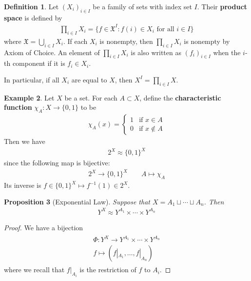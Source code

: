 \documentclass[12pt,b5paper,notitlepage]{article}
\theoremstyle{definition}
\newtheorem{df}{Definition}[section]
\newtheorem{eg}[df]{Example}
\theoremstyle{plain}
\newtheorem{pp}[df]{Proposition}
\newcommand{\fk}{\mathfrak}
\numberwithin{equation}{section}
\begin{document}
\begin{df}
Let $(X_i)_{i\in I}$ be a family of sets with index set $I$. Their \textbf{product space}   is defined by
\begin{align*}
\prod_{i\in I}X_i =\{f\in \fk X^I:f(i)\in X_i\text{ for all }i\in I \}
\end{align*}
where $\fk X=\bigcup_{i\in I}X_i$. If each $X_i$ is nonempty, then $\prod_{i\in I}X_i$ is nonempty by Axiom of Choice. An element of $\prod_{i\in I}X_i$ is also written as $(f_i)_{i\in I}$ when the $i$-th component if it is $f_i\in X_i$.
\end{df}

In particular, if all $X_i$ are equal to $X$, then $X^I=\prod_{i\in I}X$.



\begin{eg}\label{lb11}
Let $X$ be a set. For each $A\subset X$, define the \textbf{characteristic function}   $\chi_A:X\rightarrow\{0,1\}$ to be
\begin{align*}
\chi_A(x)=\left\{
\begin{array}{ll}
1&\text{if }x\in A\\
0&\text{if }x\notin A
\end{array}
\right.
\end{align*}
Then we have
\begin{align*}
2^X\approx \{0,1\}^X
\end{align*}
since the following map is bijective:
\begin{gather*}
2^X\rightarrow\{0,1\}^X\qquad A\mapsto\chi_A
\end{gather*}
Its inverse is $f\in\{0,1\}^X\mapsto f^{-1}(1)\in 2^X$.
\end{eg}

\begin{pp}[Exponential Law]\label{lb10}
Suppose that $X=A_1\sqcup\cdots\sqcup A_n$. Then
\begin{align*}
Y^X\approx Y^{A_1}\times \cdots\times Y^{A_n}
\end{align*}
\end{pp}

\begin{proof}
We have a bijection
\begin{gather}\label{eq9}
\begin{gathered}
\Phi:Y^X\rightarrow Y^{A_1}\times \cdots\times Y^{A_n}\\
f\mapsto (f|_{A_1},\dots,f|_{A_n})
\end{gathered}
\end{gather}
where we recall that $f|_{A_i}$ is the restriction of $f$ to $A_i$. 
\end{proof}
\end{document}
